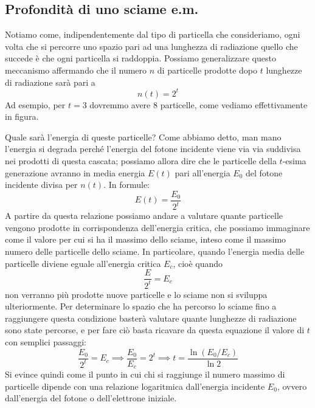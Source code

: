 \subsection{Profondità di uno sciame e.m.}

Notiamo come, indipendentemente dal tipo di particella che consideriamo, ogni volta che si percorre uno spazio pari ad una lunghezza di radiazione quello che succede è che ogni particella si raddoppia. Possiamo generalizzare questo meccanismo affermando che il numero $n$ di particelle prodotte dopo $t$ lunghezze di radiazione sarà pari a
\begin{equation*}
    n(t)=2^t
\end{equation*}
Ad esempio, per $t=3$ dovremmo avere 8 particelle, come vediamo effettivamente in figura.

Quale sarà l'energia di queste particelle? Come abbiamo detto, man mano l'energia si degrada perché l'energia del fotone incidente viene via via suddivisa nei prodotti di questa cascata; possiamo allora dire che le particelle della $t$-esima generazione avranno in media energia $E(t)$ pari all'energia $E_0$ del fotone incidente divisa per $n(t)$. In formule:
\begin{equation*}
    E(t)=\frac{E_0}{2^t}
\end{equation*}
A partire da questa relazione possiamo andare a valutare quante particelle vengono prodotte in corrispondenza dell'energia critica, che possiamo immaginare come il valore per cui si ha il massimo dello sciame, inteso come il massimo numero delle particelle dello sciame. In particolare, quando l'energia media delle particelle diviene eguale all'energia critica $E_c$, cioè quando
\begin{equation*}
    \frac{E}{2^t}=E_c
\end{equation*}
non verranno più prodotte nuove particelle e lo sciame non si sviluppa ulteriormente. Per determinare lo spazio che ha percorso lo sciame fino a raggiungere questa condizione basterà valutare quante lunghezze di radiazione sono state percorse, e per fare ciò basta ricavare da questa equazione il valore di $t$ con semplici passaggi:
\begin{equation*}
    \frac{E_0}{2^t}=E_c
    \implies
    \frac{E_0}{E_c}=2^t
    \implies
    t=\frac{\ln{(E_0/E_c)}}{\ln{2}}
\end{equation*}
Si evince quindi come il punto in cui chi si raggiunge il numero massimo di particelle dipende con una relazione logaritmica dall'energia incidente $E_0$, ovvero dall'energia del fotone o dell'elettrone iniziale.

